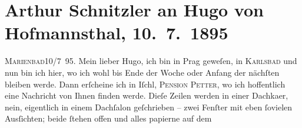 

         
         \renewcommand{\erwaehntePersonen}{Personen: Josef von Bezecný, Moritz Broda, Antonín Dvořák, Ernst Hartmann, Hugo von Hofmannsthal, Anna Kallina,  Rudolf von Österreich-Ungarn, Wilhelmine Sandrock, Adolf von Sonnenthal}
         \renewcommand{\erwaehnteInstitutionen}{Institutionen: Čecho-slavische ethnographische Ausstellung}
         \renewcommand{\erwaehnteOrte}{Orte: Alter Jüdischer Friedhof, Böhmen, Franzensbad, Hodonín, Hotel und Pension Rudolfshöhe (Leopold Petter), Hradčany, Karlsbad, Marienbad, Polen, Prag}
         \renewcommand{\erwaehnteWerke}{Werke: Der arme Jonathan, Dimitrij, Ein Attaché, Hänsel und Grethel}
               \section[Arthur Schnitzler an Hugo von Hofmannsthal, 10. 7. 1895]{ Arthur Schnitzler an Hugo von Hofmannsthal, 10. 7. 1895}\nopagebreak{}\rehead{ }\begin{ledgroupsized}[t]{13cm}\normalsize\beginnumbering \toendnotes[C]{\smallbreak\pagebreak[2]} 
\toendnotes[C]{\smallbreak}\pstart
           \raggedleft{}{\pb}\textsc{Marienbad}10/7 95.\pend
           \pstart{}Mein lieber Hugo,\pend\pstart
           ich bin in Prag geweſen, in \textsc{Karlsbad} und nun bin ich hier, wo ich wohl bis Ende der Woche oder Anfang
                    der nächſten bleiben werde. Dann erſcheine ich in Iſchl,
                            \textsc{Pension Petter}, wo ich hoffentlich eine Nachricht von Ihnen finden werde. Dieſe
                    Zeilen werden in einer Dachka{\geminationm}er, nein, eigentlich
                    in einem Dachſalon geſchrieben – zwei Fenſter mit eben ſovielen Ausſichten;
                    beide ſtehen offen und alles papierne {\pb}auf dem

\end{ledgroupsized}
